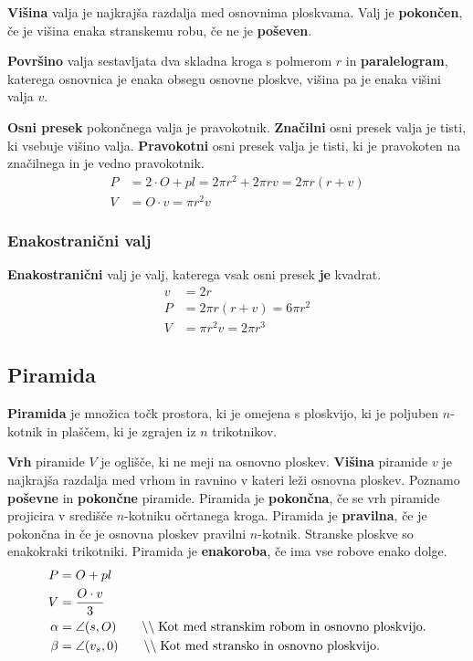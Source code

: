\documentclass[a4paper,oneside,12pt,fleqn]{article}
\newcommand\krat\cdot
\newcommand{\comment}[1]{\ensuremath{\qquad\backslash\backslash\;}\textnormal{#1}}
\numberwithin{equation}{section}
\begin{document}
\textbf{Višina} valja je najkrajša razdalja med osnovnima ploskvama. Valj je
\textbf{pokončen}, če je višina
enaka stranskemu robu, če ne je \textbf{poševen}.

\textbf{Površino} valja sestavljata dva skladna kroga s polmerom $r$ in
\textbf{paralelogram}, katerega
osnovnica je enaka obsegu osnovne ploskve, višina pa je enaka višini valja $v$.

\textbf{Osni presek} pokončnega valja je pravokotnik. \textbf{Značilni} osni presek valja je tisti, ki
vsebuje višino valja. \textbf{Pravokotni} osni presek valja je tisti, ki je pravokoten na
značilnega in je vedno pravokotnik.
\begin{align*}
  P &= 2 \krat O + pl = 2\pi r^2 + 2\pi rv = 2\pi r(r+v) \\
  V &= O \krat v = \pi r^2v
\end{align*}

\subsubsection{Enakostranični valj}
\label{sec:tel:valj:enak}
\textbf{Enakostranični} valj je valj, katerega vsak osni presek \textbf{je} kvadrat.
\begin{align*}
  v &= 2r \\
  P &= 2\pi r(r+v) = 6\pi r^2 \\
  V &= \pi r^2v = 2\pi r^3
\end{align*}

\subsection{Piramida}
\label{sec:tel:pir}
\textbf{Piramida} je množica točk prostora, ki je omejena s ploskvijo, ki je poljuben $n$-kotnik in plaščem, ki
je zgrajen iz $n$ trikotnikov.

\textbf{Vrh} piramide $V$ je oglišče, ki ne meji na osnovno ploskev. \textbf{Višina}
piramide $v$ je najkrajša razdalja med 
vrhom in ravnino v kateri leži osnovna ploskev. Poznamo \textbf{poševne} in
\textbf{pokončne} piramide. Piramida je \textbf{pokončna}, 
če se vrh piramide projicira v središče $n$-kotniku očrtanega kroga. Piramida je
\textbf{pravilna}, če je pokončna in če je osnovna ploskev pravilni $n$-kotnik. 
Stranske ploskve so enakokraki trikotniki. Piramida je \textbf{enakoroba}, če ima 
vse robove enako dolge.
\begin{align*}
  P &= O + pl \\
  V &= \frac{O \krat v}{3} \\
  \alpha &= \angle(s,O) \comment{Kot med stranskim robom in osnovno ploskvijo.} \\
  \beta &= \angle(v_s,0) \comment{Kot med stransko in osnovno ploskvijo.}
\end{align*}
\end{document}
